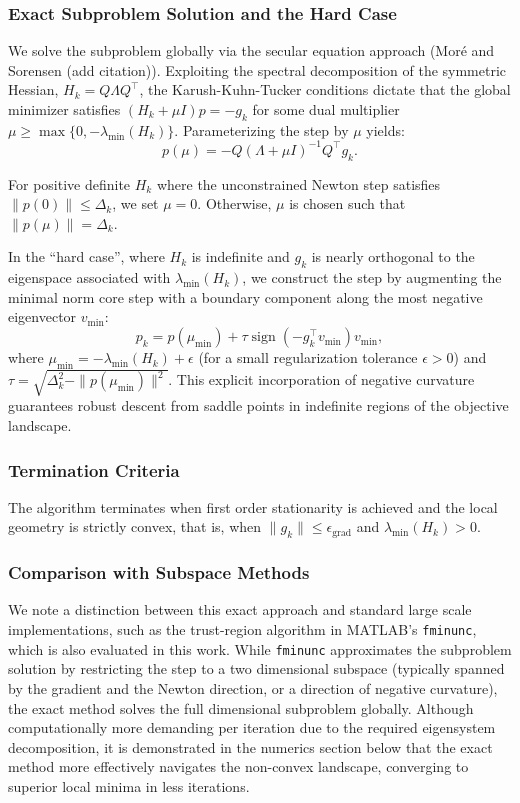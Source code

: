 \documentclass[11pt,letterpaper]{article}
\theoremstyle{definition}
\theoremstyle{plain}
\begin{document}
\subsubsection{Exact Subproblem Solution and the Hard Case}
We solve the subproblem globally via the secular equation approach (Mor\'e and Sorensen (add citation)). Exploiting the spectral decomposition of the symmetric Hessian, $H_k = Q \Lambda Q^\top$, the Karush-Kuhn-Tucker conditions dictate that the global minimizer satisfies $(H_k + \mu I)p = -g_k$ for some dual multiplier $\mu \ge \max\{0, -\lambda_{\min}(H_k)\}$. Parameterizing the step by $\mu$ yields:
$$ p(\mu) = -Q (\Lambda + \mu I)^{-1} Q^\top g_k. $$

For positive definite $H_k$ where the unconstrained Newton step satisfies $\|p(0)\| \le \Delta_k$, we set $\mu = 0$. Otherwise, $\mu$ is chosen such that $\|p(\mu)\| = \Delta_k$.

In the ``hard case'', where $H_k$ is indefinite and $g_k$ is nearly orthogonal to the eigenspace associated with $\lambda_{\min}(H_k)$, we construct the step by augmenting the minimal norm core step with a boundary component along the most negative eigenvector $v_{\min}$:
$$ p_k = p(\mu_{\min}) + \tau \operatorname{sign}(-g_k^\top v_{\min}) v_{\min}, $$
where $\mu_{\min} = -\lambda_{\min}(H_k) + \epsilon$ (for a small regularization tolerance $\epsilon > 0$) and $\tau = \sqrt{\Delta_k^2 - \|p(\mu_{\min})\|^2}$. This explicit incorporation of negative curvature guarantees robust descent from saddle points in indefinite regions of the objective landscape.

\subsubsection{Termination Criteria}
The algorithm terminates when first order stationarity is achieved and the local geometry is strictly convex, that is, when $\|g_k\| \le \epsilon_{\text{grad}}$ and $\lambda_{\min}(H_k) > 0$.

\subsubsection{Comparison with Subspace Methods}

We note a distinction between this exact approach and standard large scale implementations, such as the trust-region algorithm in MATLAB's \texttt{fminunc}, which is also evaluated in this work. While \texttt{fminunc} approximates the subproblem solution by restricting the step to a two dimensional subspace (typically spanned by the gradient and the Newton direction, or a direction of negative curvature), the exact method solves the full dimensional subproblem globally. Although computationally more demanding per iteration due to the required eigensystem decomposition, it is demonstrated in the numerics section below that the exact method more effectively navigates the non-convex landscape, converging to superior local minima in less iterations.
\end{document}
